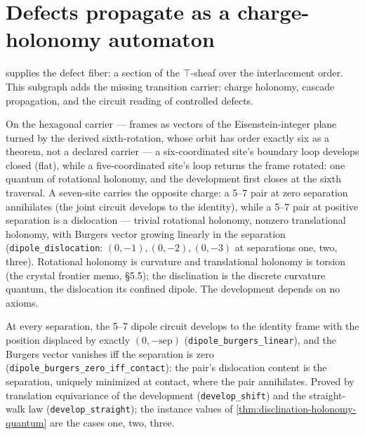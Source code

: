 \section{Defects propagate as a charge-holonomy automaton}

 supplies the defect fiber: a section of
the $\top$-sheaf over the interlacement order.  This subgraph adds the missing
transition carrier: charge holonomy, cascade propagation, and the circuit reading
of controlled defects.

\begin{theorem}\label{thm:disclination-holonomy-quantum}\leanok
On the hexagonal carrier — frames as vectors of the Eisenstein-integer plane turned
by the derived sixth-rotation, whose orbit has order exactly six as a theorem, not a
declared carrier — a six-coordinated site's boundary loop develops closed (flat),
while a five-coordinated site's loop returns the frame rotated: one quantum of
rotational holonomy, and the development first closes at the sixth traversal. A
seven-site carries the opposite charge: a 5--7 pair at zero separation annihilates
(the joint circuit develops to the identity), while a 5--7 pair at positive
separation is a dislocation — trivial rotational holonomy, nonzero translational
holonomy, with Burgers vector growing linearly in the separation
(\texttt{dipole\_dislocation}: $(0,-1), (0,-2), (0,-3)$ at separations one, two,
three). Rotational holonomy is curvature and translational holonomy is torsion (the
crystal frontier memo, \S 5.5); the disclination is the discrete curvature quantum,
the dislocation its confined dipole. The development depends on no axioms.
\end{theorem}

\begin{theorem}\label{thm:dipole-burgers-linear}\leanok{}
At every separation, the 5--7 dipole circuit develops to the identity frame
with the position displaced by exactly $(0, -\mathrm{sep})$
(\texttt{dipole\_burgers\_linear}), and the Burgers vector vanishes iff the
separation is zero (\texttt{dipole\_burgers\_zero\_iff\_contact}): the
pair's dislocation content is the separation, uniquely minimized at
contact, where the pair annihilates. Proved by translation equivariance of
the development (\texttt{develop\_shift}) and the straight-walk law
(\texttt{develop\_straight}); the instance values of
\cref{thm:disclination-holonomy-quantum} are the cases one, two, three.
\end{theorem}

